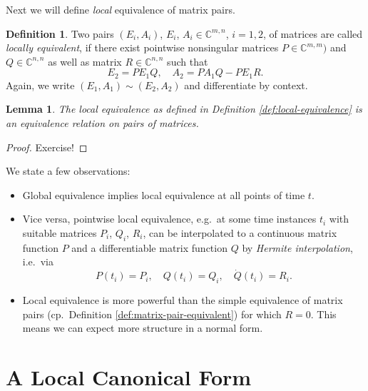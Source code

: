 \documentclass[]{book}
\providecommand{\tightlist}{%
  \setlength{\itemsep}{0pt}\setlength{\parskip}{0pt}}
\newtheorem{lemma}{Lemma}[chapter]
\theoremstyle{definition}
\newtheorem{definition}{Definition}[chapter]
\theoremstyle{definition}
\theoremstyle{definition}
\theoremstyle{definition}
\theoremstyle{remark}
\begin{document}
Next we will define \emph{local} equivalence of matrix pairs.

\begin{definition}
\protect\hypertarget{def:local-equivalence}{}{\label{def:local-equivalence} }Two pairs \((E_i,A_i)\), \(E_i\), \(A_i \in \mathbb C^{m,n}\),
\(i=1,2\), of matrices are called \emph{locally equivalent}, if there exist
pointwise nonsingular matrices \(P \in \mathbb C^{m,m})\) and \(Q\in \mathbb C^{n,n}\) as well as matrix \(R\in \mathbb C^{n,n}\) such that
\begin{equation}
E_2=PE_1Q, \quad A_2 = PA_1Q-PE_1R \label{eq:iv-loc-equiv-mpairs}.
\end{equation}
Again, we write \((E_1,A_1) \sim (E_2, A_2)\) and differentiate by context.
\end{definition}

\begin{lemma}
\protect\hypertarget{lem:iv-loc-equiv-rst}{}{\label{lem:iv-loc-equiv-rst} }The local equivalence as defined in Definition \ref{def:local-equivalence} is an equivalence relation on pairs of matrices.
\end{lemma}

\begin{proof}
{}Exercise!
\end{proof}

We state a few observations:

\begin{itemize}
\tightlist
\item
  Global equivalence implies local equivalence at all points of time \(t\).
\item
  Vice versa, pointwise local equivalence, e.g.~at some time instances \(t_i\) with suitable matrices \(P_i\), \(Q_i\), \(R_i\), can be interpolated to a continuous matrix function \(P\) and a differentiable matrix function \(Q\) by \emph{Hermite interpolation}, i.e.~via
  \[
  P(t_i) = P_i, \quad Q(t_i) = Q_i, \quad \dot Q(t_i) = R_i.
  \]
\item
  Local equivalence is more powerful than the simple equivalence of matrix pairs (cp.~Definition \ref{def:matrix-pair-equivalent}) for which \(R=0\). This means we can expect more structure in a normal form.
\end{itemize}

\hypertarget{a-local-canonical-form}{%
\section{A Local Canonical Form}\label{a-local-canonical-form}}
\end{document}

